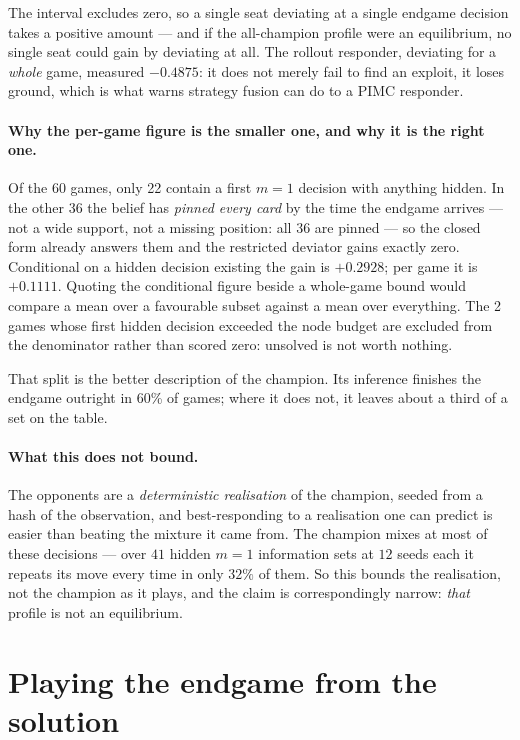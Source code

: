 \documentclass[11pt,a4paper]{article}
\begin{document}
The interval excludes zero, so a single seat deviating at a single endgame
decision takes a positive amount --- and if the all-champion profile were an
equilibrium, no single seat could gain by deviating at all. The rollout
responder, deviating for a \emph{whole} game, measured $-0.4875$: it does not
merely fail to find an exploit, it loses ground, which is what
 warns strategy fusion can do to a PIMC
responder.

\paragraph{Why the per-game figure is the smaller one, and why it is the right
one.} Of the 60 games, only 22 contain a first $m = 1$ decision with
anything hidden. In the other 36 the belief has \emph{pinned every card} by
the time the endgame arrives --- not a wide support, not a missing position:
all 36 are pinned --- so the closed form already answers them and the
restricted deviator gains exactly zero. Conditional on a hidden decision
existing the gain is $+0.2928$; per game it is $+0.1111$. Quoting the conditional
figure beside a whole-game bound would compare a mean over a favourable subset
against a mean over everything. The 2 games whose first hidden decision
exceeded the node budget are excluded from the denominator rather than scored
zero: unsolved is not worth nothing.

That split is the better description of the champion. Its inference finishes
the endgame outright in 60\% of games; where it does not, it leaves about a
third of a set on the table.

\paragraph{What this does not bound.} The opponents are a \emph{deterministic
realisation} of the champion, seeded from a hash of the observation, and
best-responding to a realisation one can predict is easier than beating the
mixture it came from. The champion mixes at most of these decisions --- over
$41$ hidden $m = 1$ information sets at $12$ seeds each it repeats its move
every time in only $32\%$ of them. So this bounds the realisation, not the
champion as it plays, and the claim is correspondingly narrow: \emph{that}
profile is not an equilibrium.

\section{Playing the endgame from the solution}
\label{sec:exactplay}
\end{document}
